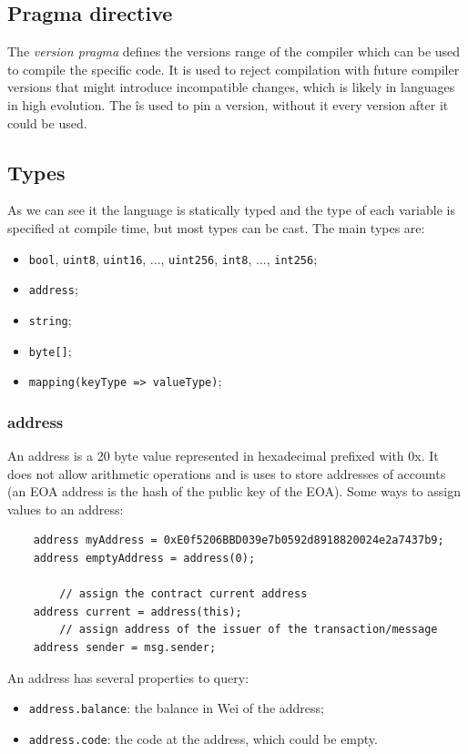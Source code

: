 \subsection{Pragma directive}
The \emph{version pragma} defines the versions range of the compiler which can be used to compile the specific code.
It is used to reject compilation with future compiler versions that might introduce incompatible changes, which is likely in languages in high evolution.
The \^ is used to pin a version, without it every version after it could be used.

\subsection{Types}
As we can see it the language is statically typed and the type of each variable is specified at compile time, but most types can be cast.
The main types are:
\begin{itemize}
    \item \verb|bool|, \verb|uint8|, \verb|uint16|, ..., \verb|uint256|, \verb|int8|, ..., \verb|int256|;
    \item \verb|address|;
    \item \verb|string|;
    \item \verb|byte[]|;
    \item \verb|mapping(keyType => valueType)|;
\end{itemize}

\subsubsection{address}
An address is a 20 byte value represented in hexadecimal prefixed with 0x.
It does not allow arithmetic operations and is uses to store addresses of accounts (an EOA address is the hash of the public key of the EOA).
Some ways to assign values to an address:
\begin{verbatim}
    address myAddress = 0xE0f5206BBD039e7b0592d8918820024e2a7437b9;
    address emptyAddress = address(0);

        // assign the contract current address
    address current = address(this);
        // assign address of the issuer of the transaction/message
    address sender = msg.sender;
\end{verbatim}

An address has several properties to query:
\begin{itemize}
    \item \verb|address.balance|: the balance in Wei of the address;
    \item \verb|address.code|: the code at the address, which could be empty.
\end{itemize}

